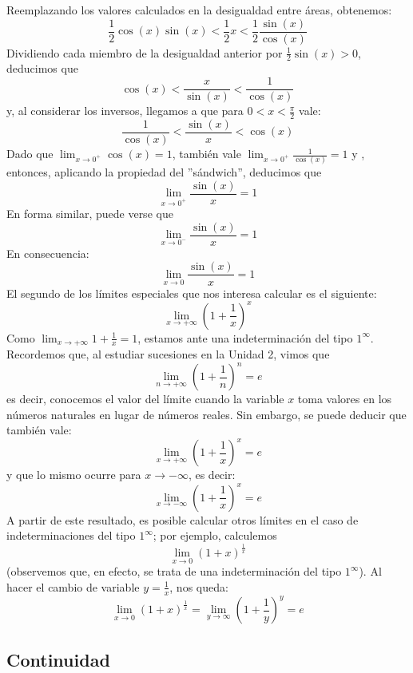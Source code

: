 \documentclass[../Teoría.root.tex]{subfiles}
\begin{document}
Reemplazando los valores calculados en la desigualdad entre áreas, obtenemos:
\[\frac{1}{2}\cos(x)\sin(x)<\frac{1}{2}x<\frac{1}{2}\frac{\sin(x)}{\cos(x)}\]
Dividiendo cada miembro de la desigualdad anterior por \(\frac{1}{2}\sin(x)>0\), deducimos que
\[\cos(x)<\frac{x}{\sin(x)}<\frac{1}{\cos(x)}\]
y, al considerar los inversos, llegamos a que para \(0<x<\frac{\pi}{2}\) vale:
\[\frac{1}{\cos(x)}<\frac{\sin(x)}{x}<\cos(x)\]
Dado que \(\lim_{x\to0^+}\cos(x)=1\), también vale \(\lim_{x\to0^+}\frac{1}{\cos(x)}=1\) y , entonces, aplicando la propiedad del ”sándwich”, deducimos que
\[\lim_{x\to0^+}\frac{\sin(x)}{x}=1\]
En forma similar, puede verse que
\[\lim_{x\to0^-}\frac{\sin(x)}{x}=1\]
En consecuencia:
\[\lim_{x\to0}\frac{\sin(x)}{x}=1\]
El segundo de los límites especiales que nos interesa calcular es el siguiente:
\[\lim_{x\to+\infty}\left(1+\frac{1}{x}\right)^x\]
Como \(\lim_{x\to+\infty}1+\frac{1}{x}=1\), estamos ante una indeterminación del tipo \(1^\infty\).
Recordemos que, al estudiar sucesiones en la Unidad 2, vimos que
\[\lim_{n\to+\infty}\left(1+\frac{1}{n}\right)^n=e\]
es decir, conocemos el valor del límite cuando la variable \(x\) toma valores en los números naturales en lugar de números reales.
Sin embargo, se puede deducir que también vale:
\[\lim_{x\to+\infty}\left(1+\frac{1}{x}\right)^x=e\]
y que lo mismo ocurre para \(x\to-\infty\), es decir:
\[\lim_{x\to-\infty}\left(1+\frac{1}{x}\right)^x=e\]
A partir de este resultado, es posible calcular otros límites en el caso de indeterminaciones del tipo \(1^\infty\); por ejemplo, calculemos
\[\lim_{x\to0}(1+x)^{\frac{1}{x}}\]
(observemos que, en efecto, se trata de una indeterminación del tipo \(1^\infty\)).
Al hacer el cambio de variable \(y=\frac{1}{x}\), nos queda:
\[\lim_{x\to0}(1+x)^{\frac{1}{x}}=\lim_{y\to\infty}(1+\frac{1}{y})^y=e\]
\subsection{Continuidad}
\end{document}
